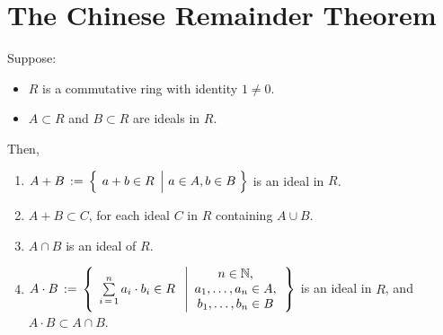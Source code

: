 
\section{The Chinese Remainder Theorem}
\setcounter{theorem}{0}
\setcounter{equation}{0}

\begin{proposition}
\mbox{}
\vskip 0.2cm
\noindent
Suppose:
\begin{itemize}
\item
	$R$ is a commutative ring with identity $1 \neq 0$.
\item
	$A \subset R$ and $B \subset R$ are ideals in $R$. 
\end{itemize}
Then,
\begin{enumerate}
\item
	$A + B \, := \, \left\{\;\left. a + b \overset{{\color{white}.}}{\in} R \;\,\right\vert\, a \in A, b \in B \;\right\}$
	is an ideal in $R$.
\item
	$A + B \subset C$, for each ideal $C$ in $R$ containing $A \cup B$.
\item
	$A \cap B$ is an ideal of $R$.
\item
	$A \cdot B \, := \, \left\{\;\,
		\overset{n}{\underset{i\,=\,1}{\sum}}\, a_{i} \cdot b_{i} \overset{{\color{white}.}}{\in} R
		\;\;\left\vert
		\begin{array}{c} n \in \N, \\ a_{1}, \ldots, a_{n} \in A, \\ b_{1}, \ldots , b_{n} \in B \end{array}
		\right.\right\}$
	is an ideal in $R$, and
	$A \cdot B \subset A \cap B$.
\end{enumerate}
\end{proposition}
\proof
